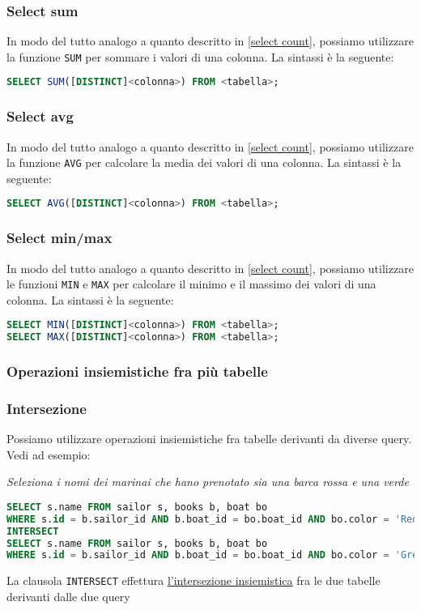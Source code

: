 \subsubsection*{Select sum}
In modo del tutto analogo a quanto descritto in \ref{select count}, possiamo utilizzare la funzione \texttt{SUM} per sommare i valori di una colonna. La sintassi è la seguente:
\begin{lstlisting}[language = SQL, style = SQL, frame = none] 
SELECT SUM([DISTINCT]<colonna>) FROM <tabella>; 
\end{lstlisting}

\subsubsection*{Select avg}
In modo del tutto analogo a quanto descritto in \ref{select count}, possiamo utilizzare la funzione \texttt{AVG} per calcolare la media dei valori di una colonna. La sintassi è la seguente:
\begin{lstlisting}[language = SQL, style = SQL, frame = none]
SELECT AVG([DISTINCT]<colonna>) FROM <tabella>;
\end{lstlisting}

\subsubsection*{Select min/max}
In modo del tutto analogo a quanto descritto in \ref{select count}, possiamo utilizzare le funzioni \texttt{MIN} e \texttt{MAX} per calcolare il minimo e il massimo dei valori di una colonna. La sintassi è la seguente:
\begin{lstlisting}[language = SQL, style = SQL, frame = none] 
SELECT MIN([DISTINCT]<colonna>) FROM <tabella>;
SELECT MAX([DISTINCT]<colonna>) FROM <tabella>;
\end{lstlisting}

\subsubsection{Operazioni insiemistiche fra più tabelle}
\subsubsection*{Intersezione}
Possiamo utilizzare operazioni insiemistiche fra tabelle derivanti da diverse query. Vedi ad esempio:
\begin{center}
	\textit{Seleziona i nomi dei marinai che hano prenotato sia una barca rossa e una verde}
\end{center}
\begin{lstlisting}[language = SQL, style = SQL, frame = none] 
SELECT s.name FROM sailor s, books b, boat bo
WHERE s.id = b.sailor_id AND b.boat_id = bo.boat_id AND bo.color = 'Red' 
INTERSECT 
SELECT s.name FROM sailor s, books b, boat bo
WHERE s.id = b.sailor_id AND b.boat_id = bo.boat_id AND bo.color = 'Green'; 
\end{lstlisting}
La clausola \verb|INTERSECT| effettura \underline{l'intersezione insiemistica} fra le due tabelle derivanti dalle due query
\vskip3mm
